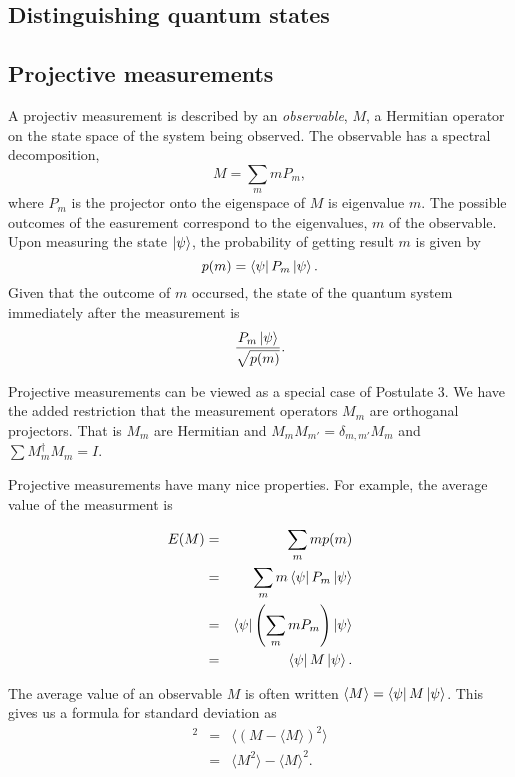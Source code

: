 \documentclass{article}
\begin{document}
\subsection{Distinguishing quantum states}

\subsection{Projective measurements}

\begin{definition}
  A projectiv measurement is described by an \textit{observable}, $M$, a Hermitian operator on the state space of the system being observed. The observable has a spectral decomposition,
  \[M=\sum_m mP_m,\]
  where $P_m$ is the projector onto the eigenspace of $M$ is eigenvalue $m$. The possible outcomes of the easurement correspond to the eigenvalues, $m$ of the observable. Upon measuring the state $\ket\psi$, the probability of getting result $m$ is given by
  \[p(m)=\bra\psi P_m\ket\psi.\]
  Given that the outcome of $m$ occursed, the state of the quantum system immediately after the measurement is
  \[\frac{P_m\ket\psi}{\sqrt{p(m)}}.\]
\end{definition}

Projective measurements can be viewed as a special case of Postulate 3. We have the added restriction that the measurement operators $M_m$ are orthoganal projectors. That is $M_m$ are Hermitian and $M_m M_{m'}=\delta_{m,m'}M_m$ and $\sum M_m^\dagger M_m=I$.

Projective measurements have many nice properties. For example, the average value of the measurment is

\begin{eqnarray*}
  E(M)&=&\sum_m mp(m) \\
  &=&\sum_m m\bra{\psi}P_m\ket{\psi} \\
  &=&\bra{\psi}\left(\sum_m mP_m\right)\ket\psi\\
  &=&\bra\psi M\ket\psi.
\end{eqnarray*}

The average value of an observable $M$ is often written $\langle M\rangle =\bra\psi M\ket\psi$. This gives us a formula for standard deviation as
\begin{eqnarray*}
  [\Delta(M)]^2&=&\langle(M-\langle M\rangle)^2\rangle \\
  &=&\langle M^2\rangle-\langle M\rangle^2.
\end{eqnarray*}
\end{document}
